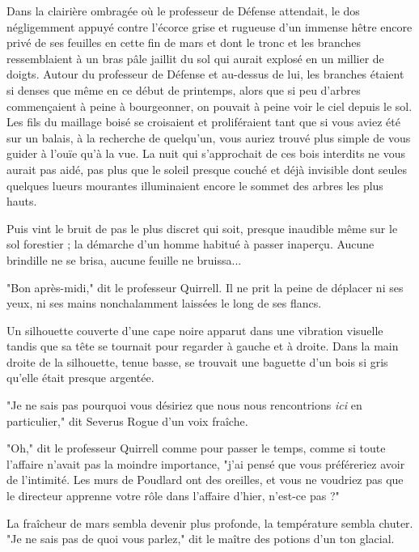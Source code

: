 Dans la clairière ombragée où le professeur de Défense attendait, le dos négligemment appuyé contre l'écorce grise et rugueuse d'un immense hêtre encore privé de ses feuilles en cette fin de mars et dont le tronc et les branches ressemblaient à un bras pâle jaillit du sol qui aurait explosé en un millier de doigts. Autour du professeur de Défense et au-dessus de lui, les branches étaient si denses que même en ce début de printemps, alors que si peu d'arbres commençaient à peine à bourgeonner, on pouvait à peine voir le ciel depuis le sol. Les fils du maillage boisé se croisaient et proliféraient tant que si vous aviez été sur un balais, à la recherche de quelqu'un, vous auriez trouvé plus simple de vous guider à l'ouïe qu'à la vue. La nuit qui s'approchait de ces bois interdits ne vous aurait pas aidé, pas plus que le soleil presque couché et déjà invisible dont seules quelques lueurs mourantes illuminaient encore le sommet des arbres les plus hauts.

Puis vint le bruit de pas le plus discret qui soit, presque inaudible même sur le sol forestier ; la démarche d'un homme habitué à passer inaperçu. Aucune brindille ne se brisa, aucune feuille ne bruissa...

"Bon après-midi," dit le professeur Quirrell. Il ne prit la peine de déplacer ni ses yeux, ni ses mains nonchalamment laissées le long de ses flancs.

Un silhouette couverte d'une cape noire apparut dans une vibration visuelle tandis que sa tête se tournait pour regarder à gauche et à droite. Dans la main droite de la silhouette, tenue basse, se trouvait une baguette d'un bois si gris qu'elle était presque argentée.

"Je ne sais pas pourquoi vous désiriez que nous nous rencontrions \emph{ici}  en particulier," dit Severus Rogue d'un voix fraîche.

"Oh," dit le professeur Quirrell comme pour passer le temps, comme si toute l'affaire n'avait pas la moindre importance, "j'ai pensé que vous préféreriez avoir de l'intimité. Les murs de Poudlard ont des oreilles, et vous ne voudriez pas que le directeur apprenne votre rôle dans l'affaire d'hier, n'est-ce pas ?"

La fraîcheur de mars sembla devenir plus profonde, la température sembla chuter. "Je ne sais pas de quoi vous parlez," dit le maître des potions d'un ton glacial.

